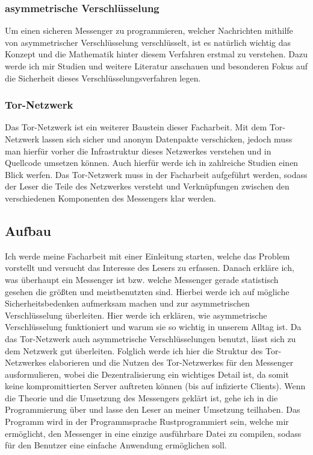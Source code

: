 \documentclass[a4paper,10pt,ngerman,
  headheight=28pt,]{scrartcl}
\begin{document}
\subsubsection{asymmetrische Verschlüsselung}
Um einen sicheren Messenger zu programmieren, welcher Nachrichten mithilfe von asymmetrischer Verschlüsselung verschlüsselt, ist es natürlich wichtig das Konzept und die Mathematik hinter diesem Verfahren erstmal zu verstehen. Dazu werde ich mir Studien und weitere Literatur anschauen und besonderen Fokus auf die Sicherheit dieses Verschlüsselungsverfahren legen.

\subsubsection{Tor-Netzwerk}
Das Tor-Netzwerk ist ein weiterer Baustein dieser Facharbeit. Mit dem Tor-Netzwerk lassen sich sicher und anonym Datenpakte verschicken, jedoch muss man hierfür vorher die Infrastruktur dieses Netzwerkes verstehen und in Quellcode umsetzen können. Auch hierfür werde ich in zahlreiche Studien einen Blick werfen. Das Tor-Netzwerk muss in der Facharbeit aufgeführt werden, sodass der Leser die Teile des Netzwerkes versteht und Verknüpfungen zwischen den verschiedenen Komponenten des Messengers klar werden.

\subsection{Aufbau}
Ich werde meine Facharbeit mit einer Einleitung starten, welche das Problem vorstellt und versucht das Interesse des Lesers zu erfassen. Danach erkläre ich, was überhaupt ein Messenger ist bzw. welche Messenger gerade statistisch gesehen die größten und meistbenutzten sind. Hierbei werde ich auf mögliche Sicherheitsbedenken aufmerksam machen und zur asymmetrischen Verschlüsselung überleiten. Hier werde ich erklären, wie asymmetrische Verschlüsselung funktioniert und warum sie so wichtig in unserem Alltag ist. Da das Tor-Netzwerk auch asymmetrische Verschlüsselungen benutzt, lässt sich zu dem Netzwerk gut überleiten. 
Folglich werde ich hier die Struktur des Tor-Netzwerkes elaborieren und die Nutzen des Tor-Netzwerkes für den Messenger ausformulieren, wobei die Dezentralisierung ein wichtiges Detail ist, da somit keine kompromittierten Server auftreten können (bis auf infizierte Clients). Wenn die Theorie und die Umsetzung des Messengers geklärt ist, gehe ich in die Programmierung über und lasse den Leser an meiner Umsetzung teilhaben. Das Programm wird in der Programmsprache \glqq Rust\grqq programmiert sein, welche mir ermöglicht, den Messenger in eine einzige ausführbare Datei zu compilen, sodass für den Benutzer eine einfache Anwendung ermöglichen soll.
\end{document}
